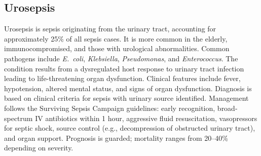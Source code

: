 \subsection{Urosepsis}
\label{sec:Urosepsis}
Urosepsis is sepsis originating from the urinary tract, accounting for approximately 25\% of all sepsis cases. It is more common in the elderly, immunocompromised, and those with urological abnormalities. Common pathogens include \textit{E.~coli}, \textit{Klebsiella}, \textit{Pseudomonas}, and \textit{Enterococcus}. The condition results from a dysregulated host response to urinary tract infection leading to life-threatening organ dysfunction. Clinical features include fever, hypotension, altered mental status, and signs of organ dysfunction. Diagnosis is based on clinical criteria for sepsis with urinary source identified. Management follows the Surviving Sepsis Campaign guidelines: early recognition, broad-spectrum IV antibiotics within 1 hour, aggressive fluid resuscitation, vasopressors for septic shock, source control (e.g., decompression of obstructed urinary tract), and organ support. Prognosis is guarded; mortality ranges from 20--40\% depending on severity.

